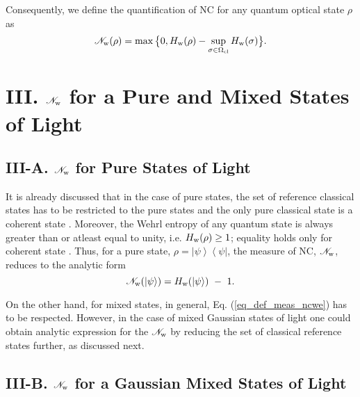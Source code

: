 \documentclass[letter,scriptaddress,twocolumn,prl,showkeys]{revtex4}
\newcommand{\ket}[1]{\left| #1 \right\rangle}
\newcommand{\bra}[1]{\left\langle #1 \right|}
\begin{document}
Consequently, we define the quantification of NC for any quantum optical state $\rho$ as
\begin{equation}
\mathscr{N}_{\rm{w}}(\rho)=\max\big\lbrace 0,H_{\rm{w}}(\rho)-\sup_{\sigma\in\Omega_{\rm{cl}}}H_{\rm{w}}(\sigma)\big\rbrace.
\label{eq_def_meas_ncwe}
\end{equation}

\section*{III. $\mathscr{N}_{\rm{w}}$ for a Pure and Mixed States of Light}

\subsection*{III-A. $\mathscr{N}_{\rm{w}}$ for Pure States of Light}

It is already discussed that in the case of pure states, the set of reference classical states has to be restricted to the pure states and the only pure classical state is a coherent state \cite{cls_pure_hillery}. 
Moreover, the Wehrl entropy of any quantum state is always greater than or atleast equal to unity, i.e. $H_{\rm{w}}(\rho)\geq 1$; equality holds only for coherent state \cite{we_min_lieb}. 
Thus, for a pure state, $\rho=\ket\psi\bra\psi$, the measure of NC, $\mathscr{N}_{\rm{w}}$, reduces to the analytic form
\begin{equation}
\mathscr{N}_{\rm{w}}(\ket\psi)=H_{\rm{w}}(\ket\psi)~-~1.
\label{eq_meas_ncwe_pure}
\end{equation}

On the other hand, for mixed states, in general, Eq. (\ref{eq_def_meas_ncwe}) has to be respected. 
However, in the case of mixed Gaussian states of light one could obtain analytic expression for the $\mathscr{N}_{\rm{w}}$ by reducing the set of classical reference states further, as discussed next.

\subsection*{III-B. $\mathscr{N}_{\rm{w}}$ for a Gaussian Mixed States of Light}
\end{document}
